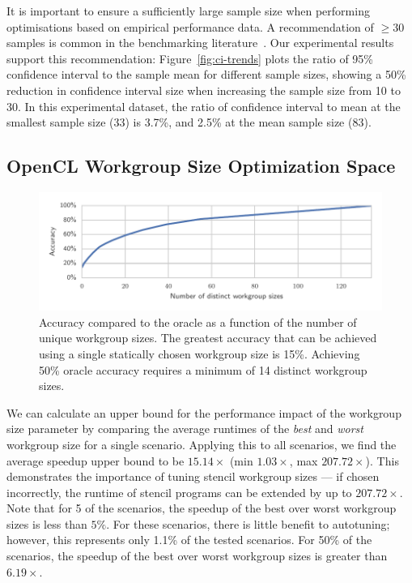 \documentclass[nonatbib,preprint,nocopyrightspace,9pt]{sigplanconf}
\begin{document}
  It is important to ensure a sufficiently large sample size when performing
  optimisations based on empirical performance data. A recommendation of $\ge 30$
  samples is common in the benchmarking literature~\cite{Georges2007}. Our
  experimental results support this recommendation: Figure~\ref{fig:ci-trends}
  plots the ratio of 95\% confidence interval to the sample mean for different
  sample sizes, showing a 50\% reduction in confidence interval size when
  increasing the sample size from 10 to 30. In this experimental dataset, the
  ratio of confidence interval to mean at the smallest sample size (33) is 3.7\%,
  and 2.5\% at the mean sample size (83).


  \subsection{OpenCL Workgroup Size Optimization Space}

  \begin{figure}
    \centering
    \includegraphics[width=\columnwidth]{img/num_params_oracle.pdf}
    \caption{%
    Accuracy compared to the oracle as a function of the number of unique
    workgroup sizes. The greatest accuracy that can be achieved using a single
    statically chosen workgroup size is 15\%. Achieving 50\% oracle accuracy
    requires a minimum of 14 distinct workgroup sizes.%
    }
    \label{fig:oracle-accuracy}
  \end{figure}

  We can calculate an upper bound for the performance impact of the workgroup size
  parameter by comparing the average runtimes of the \emph{best} and \emph{worst}
  workgroup size for a single scenario. Applying this to all scenarios, we find
  the average speedup upper bound to be $15.14\times$ (min $1.03\times$, max
  $207.72\times$). This demonstrates the importance of tuning stencil workgroup
  sizes --- if chosen incorrectly, the runtime of stencil programs can be extended
  by up to $207.72\times$. Note that for 5 of the scenarios, the speedup of the
  best over worst workgroup sizes is less than $5\%$. For these scenarios, there
  is little benefit to autotuning; however, this represents only 1.1\% of the
  tested scenarios. For 50\% of the scenarios, the speedup of the best over worst
  workgroup sizes is greater than $6.19\times$.
\end{document}
